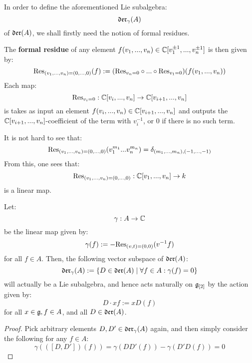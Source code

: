        In order to define the aforementioned Lie subalgebra:
            $$\mathfrak{der}_{\gamma}(A)$$
        of $\mathfrak{der}(A)$, we shall firstly need the notion of formal residues. 
        \begin{definition} \label{def: formal_residues}
            The \textbf{formal residue} of any element $f(v_1, ..., v_n) \in \mathbb{C}[v_1^{\pm 1}, ..., v_n^{\pm 1}]$ is then given by:
                $$\mathrm{Res}_{(v_1, ..., v_n) = (0, ..., 0)}(f) := ( \mathrm{Res}_{v_n = 0} \circ ... \circ \mathrm{Res}_{v_1 = 0} )( f(v_1, ..., v_n) )$$
            Each map:
                $$\mathrm{Res}_{v_i = 0}: \mathbb{C}[v_i, ..., v_n] \to \mathbb{C}[v_{i + 1}, ..., v_n]$$
            is takes as input an element $f(v_i, ..., v_n) \in \mathbb{C}[v_{i + 1}, ..., v_n]$ and outputs the $\mathbb{C}[v_{i + 1}, ..., v_n]$-coefficient of the term with $v_i^{-1}$, or $0$ if there is no such term. 
        \end{definition}
        \begin{remark}
            It is not hard to see that:
                $$\mathrm{Res}_{(v_1, ..., v_n) = (0, ..., 0)}( v_1^{m_1} ... v_n^{m_n} ) = \delta_{(m_1, ..., m_n), (-1, ..., -1)}$$
            From this, one sees that:
                $$\mathrm{Res}_{(v_1, ..., v_n) = (0, ..., 0)}: \mathbb{C}[v_1, ..., v_n] \to k$$
            is a linear map.
        \end{remark}
        \begin{lemma} \label{lemma: yangian_div_zero_vector_fields}
            Let:
                $$\gamma: A \to \mathbb{C}$$
            be the linear map given by:
                $$\gamma(f) := -\mathrm{Res}_{(v, t) = (0, 0)}(v^{-1} f)$$
            for all $f \in A$. Then, the following vector subspace of $\mathfrak{der}(A)$:
                $$\mathfrak{der}_{\gamma}(A) := \{ D \in \mathfrak{der}(A) \mid \forall f \in A: \gamma(f) = 0 \}$$
            will actually be a Lie subalgebra, and hence acts naturally on $\mathfrak{g}_{[2]}$ by the action given by:
                $$D \cdot xf := x D(f)$$
            for all $x \in \mathfrak{g}, f \in A$, and all $D \in \mathfrak{der}(A)$.
        \end{lemma}
            \begin{proof}
                Pick arbitrary elements $D, D' \in \mathfrak{der}_{\gamma}(A)$ again, and then simply consider the following for any $f \in A$:
                    $$\gamma( ([D, D'])(f) ) = \gamma( DD'(f) ) - \gamma( D'D(f) ) = 0$$
            \end{proof}

